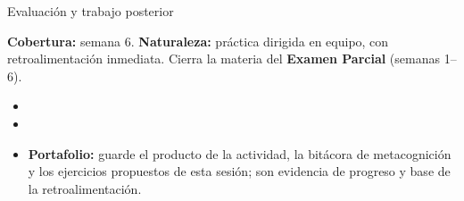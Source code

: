 \documentclass[10pt,aspectratio=169]{beamer}
\begin{document}
\begin{frame}{Evaluación y trabajo posterior}
  \small
  \begin{evalbox}
    \textbf{Cobertura:} semana 6. \textbf{Naturaleza:} práctica dirigida en equipo, con retroalimentación inmediata. Cierra la materia del \textbf{Examen Parcial} (semanas 1--6).
  \end{evalbox}
  \begin{itemize}
    \item \criterios
    \item \declaracionia
    \item \textbf{Portafolio:} guarde el producto de la actividad, la bitácora de metacognición y los ejercicios propuestos de esta sesión; son evidencia de progreso y base de la retroalimentación.
  \end{itemize}
\end{frame}
\end{document}
